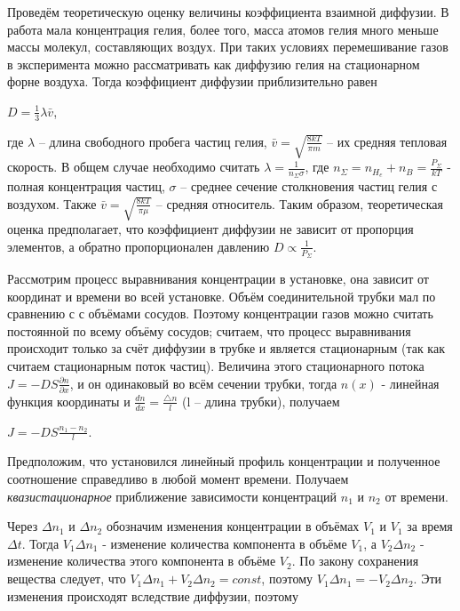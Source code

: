 \documentclass[a4paper,12pt]{article} %
\begin{document}
\item Проведём теоретическую оценку величины коэффициента взаимной диффузии. В работа мала концентрация гелия, более того, масса атомов гелия много меньше массы молекул, составляющих воздух. При таких условиях перемешивание газов в эксперимента можно рассматривать как диффузию гелия на стационарном форне воздуха. Тогда коэффициент диффузии приблизительно равен
\begin{center}
$\displaystyle D = \frac{1}{3}\lambda \bar v$,
\end{center}
где $\lambda$ -- длина свободного пробега частиц гелия, $\displaystyle \bar v = \sqrt{\frac{8kT}{\pi m}}$ -- их средняя тепловая скорость. В общем случае необходимо считать $\displaystyle \lambda = \frac{1}{n_\Sigma \sigma}$, где $\displaystyle n_\Sigma = n_H_e + n_B = \frac{P_\Sigma}{kT}$ - полная концентрация частиц, $\sigma$ -- среднее сечение столкновения частиц гелия с воздухом. Также  $\displaystyle \bar v = \sqrt{\frac{8kT}{\pi \mu}}$ -- средняя относитель. Таким образом, теоретическая оценка предполагает, что коэффициент диффузии не зависит от пропорция элементов, а обратно пропорционален давлению $\displaystyle D \propto \frac{1}{P_\Sigma}$.
\item  Рассмотрим процесс выравнивания концентрации в установке, она зависит от координат и времени во всей установке. Объём соединительной трубки мал по сравнению с с объёмами сосудов. Поэтому концентрации газов можно считать постоянной по всему объёму сосудов; считаем, что процесс выравнивания происходит только за счёт диффузии в трубке и является стационарным (так как считаем стационарным поток частиц). Величина этого стационарного потока $\displaystyle J = -DS\frac{\partial n}{\partial x}$, и он одинаковый во всём сечении трубки, тогда $n(x)$ - линейная функция координаты и $\displaystyle \frac{dn}{dx} = \frac{\triangle n}{l}$ (l -- длина трубки), получаем 
\begin{center}
$\displaystyle J = -DS \frac{n_1-n_2}{l}$.
\end{center}
Предположим, что установился линейный профиль концентрации и полученное соотношение справедливо в любой момент времени. Получаем {\sl квазистационарное} приближение зависимости концентраций $n_1$ и $n_2$ от времени.
\item Через $\Delta n_1$ и $\Delta n_2$ обозначим изменения концентрации в объёмах $V_1$ и $V_1$ за время $\Delta t$. Тогда $V_1 \Delta n_1$ - изменение количества компонента в объёме $V_1$, а $V_2 \Delta n_2$ - изменение количества этого компонента в объёме $V_2$. По закону сохранения вещества следует, что $V_1 \Delta n_1 + V_2 \Delta n_2 = const$, поэтому $V_1 \Delta n_1 = - V_2 \Delta n_2$. Эти изменения происходят вследствие диффузии, поэтому 
\end{document}
